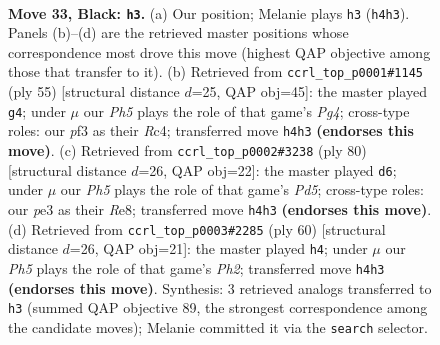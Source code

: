 \documentclass[11pt]{article}
\begin{document}
\clearpage

\begin{figure}[p]\centering
\begin{subfigure}{0.46\textwidth}\centering
\resizebox{\linewidth}{!}{%
\newchessgame
\chessboard[
  setfen={1r6/1p3p2/p3p1k1/8/P6p/4PP2/1R4PP/4R1K1 b - - 0 33},
  showmover=false,
  pgfstyle=straightmove, color=movearrow, markmove={h4-h3}
]}
\caption{}
\end{subfigure}\hfill
\begin{subfigure}{0.46\textwidth}\centering
\resizebox{\linewidth}{!}{%
\newchessgame
\chessboard[
  setfen={5r2/1R3p2/4p1k1/p3P1p1/2r5/P7/1P4PP/5RK1 b - - 1 28},
  showmover=false,
  pgfstyle=straightmove, color=movearrow, markmove={g5-g4}
]}
\caption{}
\end{subfigure}
\\[4pt]
\begin{subfigure}{0.46\textwidth}\centering
\resizebox{\linewidth}{!}{%
\newchessgame
\chessboard[
  setfen={4R3/r4pk1/6p1/3P3p/3rp2P/P5P1/5P2/R5K1 w - - 8 41},
  showmover=false,
  pgfstyle=straightmove, color=movearrow, markmove={d5-d6}
]}
\caption{}
\end{subfigure}\hfill
\begin{subfigure}{0.46\textwidth}\centering
\resizebox{\linewidth}{!}{%
\newchessgame
\chessboard[
  setfen={2r2k2/5pp1/7p/p1p5/P3P3/1PR5/5KPP/8 w - - 2 31},
  showmover=false,
  pgfstyle=straightmove, color=movearrow, markmove={h2-h4}
]}
\caption{}
\end{subfigure}
\caption{\textbf{Move 33, Black: \texttt{h3}.} (a) Our position; Melanie plays \texttt{h3} (\texttt{h4h3}). Panels (b)--(d) are the retrieved master positions whose correspondence most drove this move (highest QAP objective among those that transfer to it). (b) Retrieved from \texttt{ccrl\_top\_p0001\#1145} (ply 55) [structural distance $d$=25, QAP obj=45]: the master played \texttt{g4}; under $\mu$ our \emph{Ph5} plays the role of that game's \emph{Pg4}; cross-type roles: our \emph{p}f3 as their \emph{R}c4; transferred move \texttt{h4h3} \textbf{(endorses this move)}. (c) Retrieved from \texttt{ccrl\_top\_p0002\#3238} (ply 80) [structural distance $d$=26, QAP obj=22]: the master played \texttt{d6}; under $\mu$ our \emph{Ph5} plays the role of that game's \emph{Pd5}; cross-type roles: our \emph{p}e3 as their \emph{R}e8; transferred move \texttt{h4h3} \textbf{(endorses this move)}. (d) Retrieved from \texttt{ccrl\_top\_p0003\#2285} (ply 60) [structural distance $d$=26, QAP obj=21]: the master played \texttt{h4}; under $\mu$ our \emph{Ph5} plays the role of that game's \emph{Ph2}; transferred move \texttt{h4h3} \textbf{(endorses this move)}. Synthesis: 3 retrieved analogs transferred to \texttt{h3} (summed QAP objective 89, the strongest correspondence among the candidate moves); Melanie committed it via the \texttt{search} selector.}
\label{fig:thought-m65}
\end{figure}
\end{document}
